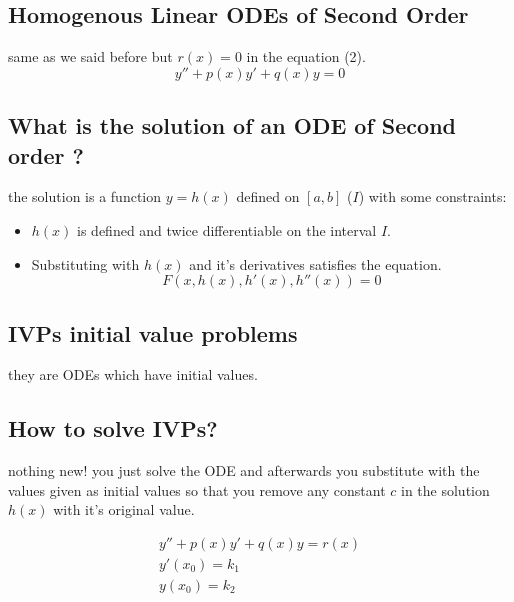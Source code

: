 \documentclass[11pt]{article}
\theoremstyle{definition}
\begin{document}
\subsection{Homogenous Linear ODEs of Second Order}

same as we said before but $r(x)=0$ in the equation (2).
\begin{equation}
\label{H}
    y''+p(x)y'+q(x)y=0
\end{equation}

\subsection{What  is the solution of an ODE of Second order ?}
the solution is a function $y=h(x)$ defined on $[a,b]$ ($I$) with some constraints: 
\begin{itemize}
    \item $h(x)$ is defined and twice differentiable on the interval $I$.
    \item Substituting with $h(x)$ and it's derivatives satisfies the equation.
    \begin{equation}
        F(x, h(x), h'(x), h''(x)) = 0
    \end{equation}
    
\end{itemize}

\subsection{IVPs initial value problems}

they are ODEs which have initial values.


\subsection{How to solve IVPs?}
nothing new! you just solve the ODE and afterwards you substitute with the values given as initial values so that you remove any constant $c$ in the solution $h(x)$ with it's original value. 
\begin{shaded}
\begin{equation} 
\begin{split} 
  y''+p(x)y'+q(x)y=r(x) \\
  y'(x_0) = k_1 \\
  y(x_0) = k_2\\
  \end{split} 
\end{equation}
\end{shaded}
\end{document}
